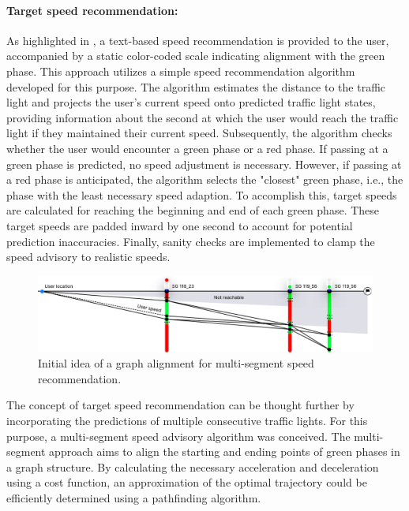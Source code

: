 \paragraph{Target speed recommendation:} As highlighted in , a text-based speed recommendation is provided to the user, accompanied by a static color-coded scale indicating alignment with the green phase. This approach utilizes a simple speed recommendation algorithm developed for this purpose. The algorithm estimates the distance to the traffic light and projects the user's current speed onto predicted traffic light states, providing information about the second at which the user would reach the traffic light if they maintained their current speed. Subsequently, the algorithm checks whether the user would encounter a green phase or a red phase. If passing at a green phase is predicted, no speed adjustment is necessary. However, if passing at a red phase is anticipated, the algorithm selects the "closest" green phase, i.e., the phase with the least necessary speed adaption. To accomplish this, target speeds are calculated for reaching the beginning and end of each green phase. These target speeds are padded inward by one second to account for potential prediction inaccuracies. Finally, sanity checks are implemented to clamp the speed advisory to realistic speeds.

\begin{figure}[htbp]
\centering
\includegraphics[width=\linewidth]{images/multi-segment-approach.pdf}
\caption{Initial idea of a graph alignment for multi-segment speed recommendation.}
\label{fig:multi-segment-approach}
\end{figure}

The concept of target speed recommendation can be thought further by incorporating the predictions of multiple consecutive traffic lights. For this purpose, a multi-segment speed advisory algorithm was conceived. The multi-segment approach aims to align the starting and ending points of green phases in a graph structure. By calculating the necessary acceleration and deceleration using a cost function, an approximation of the optimal trajectory could be efficiently determined using a pathfinding algorithm. 

